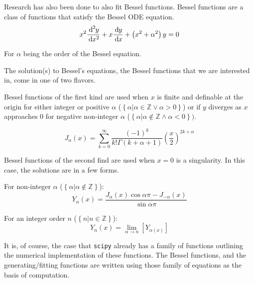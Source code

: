 \documentclass[twocolumn]{article}
\begin{document}
Research has also been done to also fit Bessel functions. Bessel functions are a class of functions that satisfy the Bessel ODE equation.
\begin{equation}
	x^2 \frac{\diff[2]{y}}{\diff{x^2}} + x \frac{\diff{y}}{\diff{x}} + \left( x^2 + \alpha^2 \right) y = 0
	\label{eq:Bessel_ODE_equation}
\end{equation}

For $\alpha$ being the order of the Bessel equation. 

The solution(s) to Bessel's equations, the Bessel functions that we are interested in, come in one of two flavors. 

Bessel functions of the first kind are used when $x$ is finite and definable at the origin for either integer or positive $\alpha$ ($\left\{ \left. \alpha \right| \alpha \in \mathbb{Z} \lor \alpha > 0 \right\}$) or if $y$ diverges as $x$ approaches $0$ for negative non-integer $\alpha$ ($\left\{ \left. \alpha \right| \alpha \notin \mathbb{Z} \land \alpha < 0\right\})$.

\begin{equation}
	J_{\alpha}(x) = \sum_{k=0}^{\infty} \frac{\left(-1\right)^{k}}{k! \Gamma(k+\alpha+1)} \left( \frac{x}{2} \right)^{2k + \alpha}
	\label{eq:Bessel_equation_firstkind}
\end{equation}

Bessel functions of the second find are used when $x=0$ is a singularity. In this case, the solutions are in a few forms.

For non-integer $\alpha$ ($\left\{ \left. \alpha \right| \alpha \notin \mathbb{Z} \right\}$):
\begin{equation}
	Y_{\alpha}(x) = \frac{J_{\alpha}(x) \cos{\alpha \pi} - J_{-\alpha}(x)}{\sin{\alpha\pi}}
	\label{eq:Bessel_equation_secondkind_noninterger}
\end{equation}

For an integer order $n$ ($\left\{ \left. n \right| n \in \mathbb{Z} \right\}$):
\begin{equation}
	Y_{n}(x) = \lim_{\alpha \rightarrow n} \left[ {Y_{\alpha(x)}} \right]
	\label{eq:Bessel_equation_secondkind_interger}
\end{equation}

It is, of course, the case that \texttt{scipy} already has a family of functions outlining the numerical implementation of these functions. The Bessel functions, and the generating/fitting functions are written using those family of equations as the basis of computation. 
\end{document}
